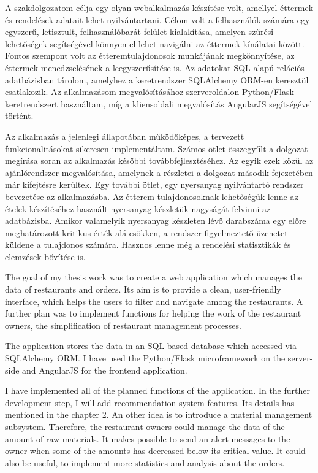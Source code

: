 
A szakdolgozatom célja egy olyan webalkalmazás készítése volt, amellyel éttermek és rendelések adatait lehet nyilvántartani. Célom volt a felhasználók számára egy egyszerű, letisztult, felhasználóbarát felület kialakítása, amelyen szűrési lehetőségek segítségével könnyen el lehet navigálni az éttermek kínálatai között. Fontos szempont volt az étteremtulajdonosok munkájának megkönnyítése, az éttermek menedzselésének a leegyszerűsítése is. Az adatokat SQL alapú relációs adatbázisban tárolom, amelyhez a keretrendszer SQLAlchemy ORM-en keresztül csatlakozik. Az alkalmazásom megvalósításához szerveroldalon Python/Flask keretrendszert használtam, míg a kliensoldali megvalósítás AngularJS segítségével történt.

Az alkalmazás a jelenlegi állapotában működőképes, a tervezett funkcionalitásokat sikeresen implementáltam. Számos ötlet összegyűlt a dolgozat megírása soran az alkalmazás későbbi továbbfejlesztéséhez. Az egyik ezek közül az ajánlórendszer megvalósítása, amelynek a részletei a dolgozat második fejezetében már kifejtésre kerültek. Egy további ötlet, egy nyersanyag nyilvántartó rendszer bevezetése az alkalmazásba. Az étterem tulajdonosoknak lehetőségük lenne az ételek készítéséhez használt nyersanyag készletük nagyságát felvinni az adatbázisba. Amikor valamelyik nyersanyag készleten lévő darabszáma egy előre meghatározott kritikus érték alá csökken, a rendszer figyelmeztető üzenetet küldene a tulajdonos számára. Hasznos lenne még a rendelési statisztikák és elemzések bővítése is.


The goal of my thesis work was to create a web application which manages the data of restaurants and orders. Its aim is to provide a clean, user-friendly interface, which helps the users to filter and navigate among the restaurants. A further plan was to implement functions for helping the work of the restaurant owners, the simplification of restaurant management processes.

The application stores the data in an SQL-based database which accessed via SQLAlchemy ORM. I have used the Python/Flask microframework on the server-side and AngularJS for the frontend application.

I have implemented all of the planned functions of the application. In the further development step, I will add recommendation system features. Its details has mentioned in the chapter 2. An other idea is to introduce a material management subsystem. Therefore, the restaurant owners could manage the data of the amount of raw materials. It makes possible to send an alert messages to the owner when some of the amounts has decreased below its critical value. It could also be useful, to implement more statistics and analysis about the orders.
